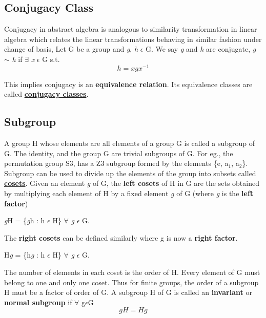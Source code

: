 \subsection{Conjugacy Class}
Conjugacy in abstract algebra is analogous to similarity transformation in linear algebra
which relates the linear transformations behaving in similar fashion under change of basis,
Let G be a group and \textit{g}, \textit{h} $\epsilon$ G. We say \textit{g} and \textit{h} are conjugate,
\textit{g} $\sim$ \textit{h} if $\exists$ \textit{x} $\epsilon$ G s.t. 
\begin{equation}
    h = xgx^{-1} 
\end{equation}

This implies conjugacy is an \textbf{equivalence relation}. Its equivalence classes are called \href{https://www.youtube.com/watch?v=yOt3ppQGuto}{\textbf{conjugacy classes}}.

\subsection{Subgroup}
A group H whose elements are all elements of a group G is called a subgroup of G. 
The identity, and the group G are trivial subgroups of G. For eg., the permutation group S3, has a Z3 subgroup formed by the elements \{e, a$_1$, a$_2$\}. 
Subgroup can be used to divide up the elements of the group into subsets called \href{https://en.wikipedia.org/wiki/Coset}{\textbf{cosets}}.
Given an element \textit{g} of G, the \textbf{left cosets} of H in G are the sets obtained by multiplying each element of H by a fixed element \textit{g} of G (where \textit{g} is the \textbf{left factor})
\begin{center}
    \textit{g}H = \{\textit{g}h : h $\epsilon$ H\} $\forall$ \textit{g} $\epsilon$ G.
\end{center}
The \textbf{right cosets} can be defined similarly where g is now a \textbf{right factor}.
\begin{center}
    H\textit{g} = \{h\textit{g} : h $\epsilon$ H\} $\forall$ \textit{g} $\epsilon$ G.
\end{center}

The number of elements in each coset is the order of H. Every element of G
must belong to one and only one coset. Thus for finite groups, the order of
a subgroup H must be a factor of order of G. 
A subgroup H of G is called an \textbf{invariant} or \textbf{normal subgroup} if $\forall$ g$\epsilon$G
\begin{equation}
    gH = Hg
\end{equation}

